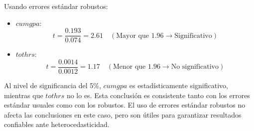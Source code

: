 \documentclass[10pt,a4paper]{article}
\begin{document}
\begin{enumerate}
{ Usando errores estándar robustos:
\begin{itemize}
       \item \(cumgpa\): \[
    t = \frac{0.193}{0.074} = 2.61 \quad (\text{Mayor que } 1.96 \rightarrow \text{Significativo})
    \]
    \item \(tothrs\): \[
    t = \frac{0.0014}{0.0012} = 1.17 \quad (\text{Menor que } 1.96 \rightarrow \text{No significativo})
    \]
\end{itemize}

 Al nivel de significancia del 5\%,  \(cumgpa\) es estadísticamente significativo, mientras que \(tothrs\) no lo es. Esta conclusión es consistente tanto con los errores estándar usuales como con los robustos.
 El uso de errores estándar robustos no afecta las conclusiones en este caso, pero son útiles para garantizar resultados confiables ante heterocedasticidad.

}














\end{enumerate}
\end{document}
